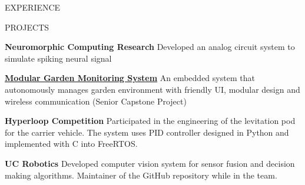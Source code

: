 \documentclass{../lib/resume} %
\begin{document}
\begin{rSection}{EXPERIENCE}
\end{rSection}


\begin{rSection}{PROJECTS}
    \vspace{-1em}

    \item \textbf{Neuromorphic Computing Research} {Developed an analog circuit system to simulate spiking neural signal}
    \item \href{https://github.com/liu2z2/mgms}{\textbf{Modular Garden Monitoring System}} {An embedded system that autonomously manages garden environment with friendly UI, modular design and wireless communication (Senior Capstone Project)}
    \item \textbf{Hyperloop Competition} {Participated in the engineering of the levitation pod for the carrier vehicle. The system uses PID controller designed in Python and implemented with C into FreeRTOS.}
    \item \textbf{UC Robotics} {Developed computer vision system for sensor fusion and decision making algorithms. Maintainer of the GitHub repository while in the team.}

\end{rSection}

%
%
%
%
%
\end{document}
